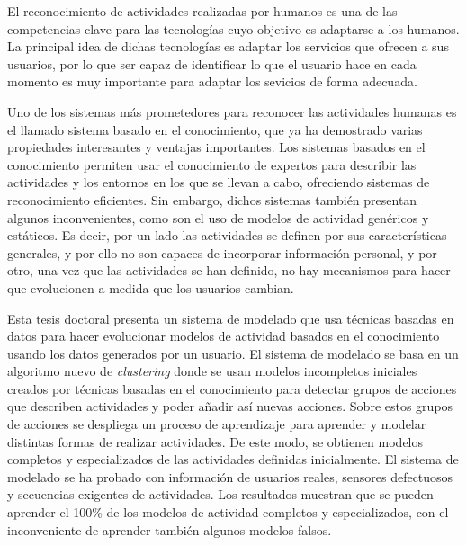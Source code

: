 \begin{resumen}        %




El reconocimiento de actividades realizadas por humanos es una de las competencias clave para las tecnologías cuyo objetivo es adaptarse a los humanos. La principal idea de dichas tecnologías es adaptar los servicios que ofrecen a sus usuarios, por lo que ser capaz de identificar lo que el usuario hace en cada momento es muy importante para adaptar los sevicios de forma adecuada.

Uno de los sistemas más prometedores para reconocer las actividades humanas es el llamado sistema basado en el conocimiento, que ya ha demostrado varias propiedades interesantes y ventajas importantes. Los sistemas basados en el conocimiento permiten usar el conocimiento de expertos para describir las actividades y los entornos en los que se llevan a cabo, ofreciendo sistemas de reconocimiento eficientes. Sin embargo, dichos sistemas también presentan algunos inconvenientes, como son el uso de modelos de actividad genéricos y estáticos. Es decir, por un lado las actividades se definen por sus características generales, y por ello no son capaces de incorporar información personal, y por otro, una vez que las actividades se han definido, no hay mecanismos para hacer que evolucionen a medida que los usuarios cambian.

Esta tesis doctoral presenta un sistema de modelado que usa técnicas basadas en datos para hacer evolucionar modelos de actividad basados en el conocimiento usando los datos generados por un usuario. El sistema de modelado se basa en un algoritmo nuevo de \textit{clustering} donde se usan modelos incompletos iniciales creados por técnicas basadas en el conocimiento para detectar grupos de acciones que describen actividades y poder añadir así nuevas acciones. Sobre estos grupos de acciones se despliega un proceso de aprendizaje para aprender y modelar distintas formas de realizar actividades. De este modo, se obtienen modelos completos y especializados de las actividades definidas inicialmente. El sistema de modelado se ha probado con información de usuarios reales, sensores defectuosos y secuencias exigentes de actividades. Los resultados muestran que se pueden aprender el 100\% de los modelos de actividad completos y especializados, con el inconveniente de aprender también algunos modelos falsos.


\end{resumen}

